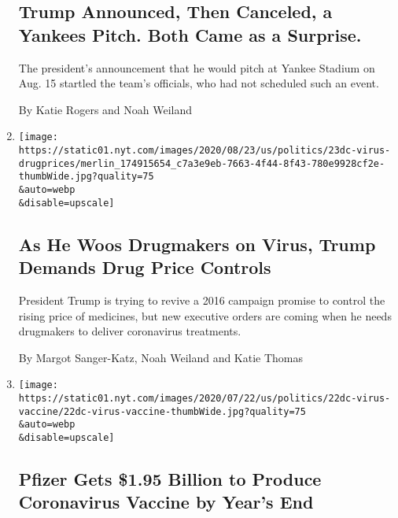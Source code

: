 \begin{enumerate}
  \hypertarget{trump-announced-then-canceled-a-yankees-pitch-both-came-as-a-surprise}{%
  \subsection{Trump Announced, Then Canceled, a Yankees Pitch. Both Came
  as a
  Surprise.}\label{trump-announced-then-canceled-a-yankees-pitch-both-came-as-a-surprise}}

  The president's announcement that he would pitch at Yankee Stadium on
  Aug. 15 startled the team's officials, who had not scheduled such an
  event.

  By Katie Rogers and Noah Weiland
\item
  \href{/2020/07/24/us/politics/trump-drug-prices-coronavirus.html}{}

  \texttt{[image: https://static01.nyt.com/images/2020/08/23/us/politics/23dc-virus-drugprices/merlin\_174915654\_c7a3e9eb-7663-4f44-8f43-780e9928cf2e-thumbWide.jpg?quality=75\\\&auto=webp\\\&disable=upscale]}

  \hypertarget{as-he-woos-drugmakers-on-virus-trump-demands-drug-price-controls}{%
  \subsection{As He Woos Drugmakers on Virus, Trump Demands Drug Price
  Controls}\label{as-he-woos-drugmakers-on-virus-trump-demands-drug-price-controls}}

  President Trump is trying to revive a 2016 campaign promise to control
  the rising price of medicines, but new executive orders are coming
  when he needs drugmakers to deliver coronavirus treatments.

  By Margot Sanger-Katz, Noah Weiland and Katie Thomas
\item
  \href{/2020/07/22/us/politics/pfizer-coronavirus-vaccine.html}{}

  \texttt{[image: https://static01.nyt.com/images/2020/07/22/us/politics/22dc-virus-vaccine/22dc-virus-vaccine-thumbWide.jpg?quality=75\\\&auto=webp\\\&disable=upscale]}

  \hypertarget{pfizer-gets-195-billion-to-produce-coronavirus-vaccine-by-years-end}{%
  \subsection{Pfizer Gets \$1.95 Billion to Produce Coronavirus Vaccine
  by Year's
  End}\label{pfizer-gets-195-billion-to-produce-coronavirus-vaccine-by-years-end}}


\end{enumerate}
